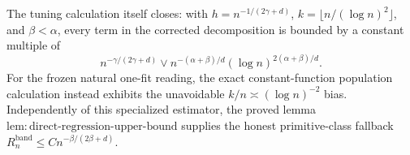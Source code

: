 The tuning calculation itself closes: with \(h=n^{-1/(2\gamma+d)}\), \(k=\lfloor n/(\log n)^2\rfloor\), and \(\beta<\alpha\), every term in the corrected decomposition is bounded by a constant multiple of
\[
n^{-\gamma/(2\gamma+d)}\vee n^{-(\alpha+\beta)/d}(\log n)^{2(\alpha+\beta)/d}.
\]
For the frozen natural one-fit reading, the exact constant-function population calculation instead exhibits the unavoidable \(k/n\asymp(\log n)^{-2}\) bias.  Independently of this specialized estimator, the proved lemma \(\mathrm{lem:direct\mbox{-}regression\mbox{-}upper\mbox{-}bound}\) supplies the honest primitive-class fallback \(R_n^{\mathrm{band}}\leq Cn^{-\beta/(2\beta+d)}\).